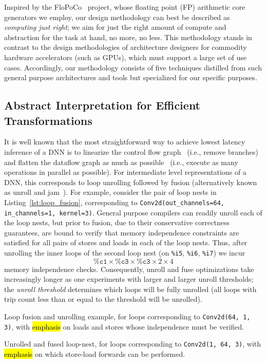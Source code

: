 Inspired by the FloPoCo~\cite{8877424} project, whose floating point (FP) arithmetic core generators we employ, our design methodology can best be described as \emph{computing just right}; 
we aim for just the right amount of compute and abstraction for the task at hand, no more, no less.
This methodology stands in contrast to the design methodologies of architecture designers for commodity hardware accelerators (such as GPUs), which must support a large set of use cases.
Accordingly, our methodology consists of five techniques distilled from such general purpose architectures and tools but specialized for our specific purposes.

\subsection{Abstract Interpretation for Efficient Transformations}\label{subsec:loop-unrolling}

It is well known that the most straightforward way to achieve lowest latency inference of a DNN is to linearize the control flow graph~\cite{osti_1574050} (i.e., remove branches) and flatten the dataflow graph as much as possible~\cite{10.1145/3295500.3356173} (i.e., execute as many operations in parallel as possible).
For intermediate level representations of a DNN, this corresponds to loop unrolling followed by fusion (alternatively known as unroll and jam~\cite{thomas1971catalogue}).
For example, consider the pair of loop nests in Listing~\ref{lst:loop_fusion}, corresponding to \texttt{Conv2d(out\_channels=64, in\_channels=1, kernel=3)}.
General purpose compilers can readily unroll each of the loop nests, but prior to fusion, due to their conservative correctness guarantees, are bound to verify that memory independence constraints are satisfied for all pairs of stores and loads in each of the loop nests.
Thus, after unrolling the inner loops of the second loop nest (on \texttt{\%i5}, \texttt{\%i6}, \texttt{\%i7}) we incur
\[
	\mathtt{\%c1} \times \mathtt{\%c3} \times \mathtt{\%c3} \times 2 \times 4
\]
memory independence checks.
Consequently, unroll and fuse optimizations take increasingly longer as one experiments with larger and larger unroll thresholds; the \emph{unroll threshold} determines which loops will be fully unrolled (all loops with trip count less than or equal to the threshold will be unrolled).
\begin{mylisting}{Loop fusion and unrolling example, for loops corresponding to \texttt{Conv2d(64, 1, 3)}, with \hl{emphasis} on loads and stores whose independence must be verified.}
	
	\label{lst:loop_fusion}
\end{mylisting}
\begin{mylisting}{Unrolled and fused loop-nest, for loops corresponding to \texttt{Conv2d(1, 64, 3)}, with \hl{emphasis} on which store-load forwards can be performed.}
	
	\label{lst:storeloadforwarding}
\end{mylisting}

